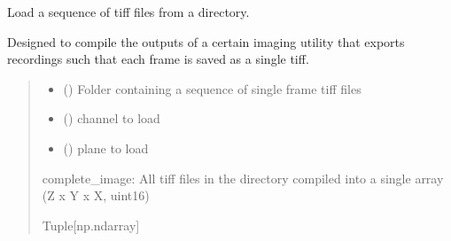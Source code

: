 \documentclass[letterpaper,10pt,english]{sphinxmanual}
\begin{document}
\begin{fulllineitems}
\label{\detokenize{CalSciPy.io:CalSciPy.io.load_bruker_tiffs}}
\pysigstartsignatures
{}
\pysigstopsignatures
\sphinxAtStartPar
Load a sequence of tiff files from a directory.

\sphinxAtStartPar
Designed to compile the outputs of a certain imaging utility
that exports recordings such that each frame is saved as a single tiff.
\begin{quote}\begin{description}
\begin{itemize}
\item {} 
\sphinxAtStartPar
{} (\sphinxstyleliteralemphasis{\sphinxupquote{{[}}}\sphinxstyleliteralemphasis{\sphinxupquote{, }}\sphinxstyleliteralemphasis{\sphinxupquote{{]}}}) \sphinxhyphen{}\sphinxhyphen{} Folder containing a sequence of single frame tiff files

\item {} 
\sphinxAtStartPar
{} (\sphinxstyleliteralemphasis{\sphinxupquote{{[}}}\sphinxstyleliteralemphasis{\sphinxupquote{{]}}}) \sphinxhyphen{}\sphinxhyphen{} channel to load

\item {} 
\sphinxAtStartPar
{} (\sphinxstyleliteralemphasis{\sphinxupquote{{[}}}\sphinxstyleliteralemphasis{\sphinxupquote{{]}}}) \sphinxhyphen{}\sphinxhyphen{} plane to load

\end{itemize}

\sphinxAtStartPar
complete\_image:  All tiff files in the directory compiled into a single array (Z x Y x X, uint16)

\sphinxAtStartPar
Tuple{[}np.ndarray{]}

\end{description}\end{quote}

\end{fulllineitems}
\end{document}
